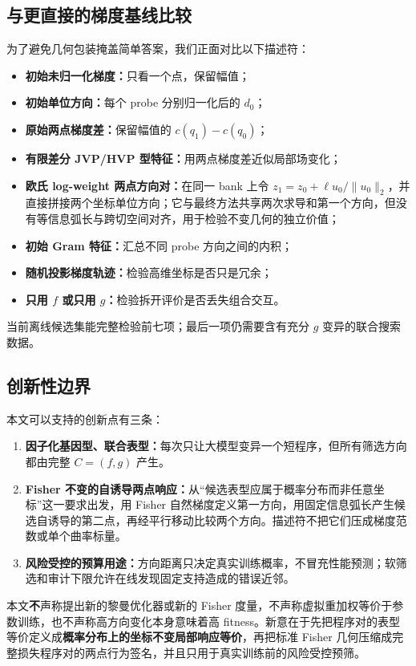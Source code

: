 \documentclass[UTF8,11pt]{ctexart}
\begin{document}
\subsection{与更直接的梯度基线比较}

为了避免几何包装掩盖简单答案，我们正面对比以下描述符：
\begin{itemize}
  \item \textbf{初始未归一化梯度：}只看一个点，保留幅值；
  \item \textbf{初始单位方向：}每个 probe 分别归一化后的 $d_0$；
  \item \textbf{原始两点梯度差：}保留幅值的 $c(q_1)-c(q_0)$；
  \item \textbf{有限差分 JVP/HVP 型特征：}用两点梯度差近似局部场变化；
  \item \textbf{欧氏 log-weight 两点方向对：}在同一 bank 上令 $z_1=z_0+\ell u_0/\lVert u_0\rVert_2$，并直接拼接两个坐标单位方向；它与最终方法共享两次求导和第一个方向，但没有等信息弧长与跨切空间对齐，用于检验不变几何的独立价值；
  \item \textbf{初始 Gram 特征：}汇总不同 probe 方向之间的内积；
  \item \textbf{随机投影梯度轨迹：}检验高维坐标是否只是冗余；
  \item \textbf{只用 $f$ 或只用 $g$：}检验拆开评价是否丢失组合交互。
\end{itemize}
当前离线候选集能完整检验前七项；最后一项仍需要含有充分 $g$ 变异的联合搜索数据。

\subsection{创新性边界}

本文可以支持的创新点有三条：
\begin{enumerate}
  \item \textbf{因子化基因型、联合表型：}每次只让大模型变异一个短程序，但所有筛选方向都由完整 $C=(f,g)$ 产生。
  \item \textbf{Fisher 不变的自诱导两点响应：}从“候选表型应属于概率分布而非任意坐标”这一要求出发，用 Fisher 自然梯度定义第一方向，用固定信息弧长产生候选自诱导的第二点，再经平行移动比较两个方向。描述符不把它们压成梯度范数或单个曲率标量。
  \item \textbf{风险受控的预算用途：}方向距离只决定真实训练概率，不冒充性能预测；软筛选和审计下限允许在线发现固定支持造成的错误近邻。
\end{enumerate}

本文\textbf{不}声称提出新的黎曼优化器或新的 Fisher 度量，不声称虚拟重加权等价于参数训练，也不声称高方向变化本身意味着高 fitness。新意在于先把程序对的表型等价定义成\textbf{概率分布上的坐标不变局部响应等价}，再把标准 Fisher 几何压缩成完整损失程序对的两点行为签名，并且只用于真实训练前的风险受控预筛。
\end{document}

